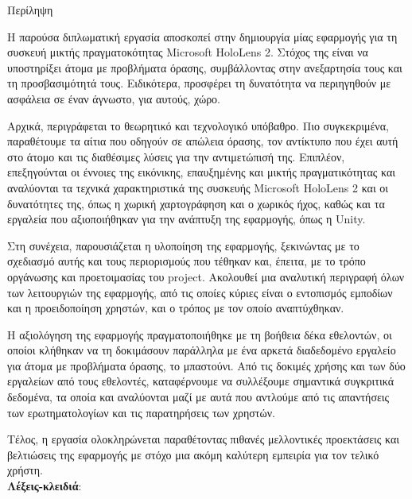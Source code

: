 \pagestyle{plain}
\begin{center}
{\LARGE Περίληψη}\\[1cm]
\end{center}

\setlength{\parindent}{0pt}
Η παρούσα διπλωματική εργασία αποσκοπεί στην δημιουργία μίας εφαρμογής για τη συσκευή μικτής πραγματοκότητας Microsoft HoloLens 2. Στόχος της είναι να υποστηρίξει άτομα με προβλήματα όρασης, συμβάλλοντας στην ανεξαρτησία τους και τη προσβασιμότητά τους. Ειδικότερα, προσφέρει τη δυνατότητα να περιηγηθούν με ασφάλεια σε έναν άγνωστο, για αυτούς, χώρο.

Αρχικά, περιγράφεται το θεωρητικό και τεχνολογικό υπόβαθρο. Πιο συγκεκριμένα, παραθέτουμε τα αίτια που οδηγούν σε απώλεια όρασης, τον αντίκτυπο που έχει αυτή στο άτομο και τις διαθέσιμες λύσεις για την αντιμετώπισή της. Επιπλέον, επεξηγούνται οι έννοιες της εικόνικης, επαυξημένης και μικτής πραγματικότητας και αναλύονται τα τεχνικά χαρακτηριστικά της συσκευής Microsoft HoloLens 2 και οι δυνατότητες της, όπως η χωρική χαρτογράφηση και ο χωρικός ήχος, καθώς και τα εργαλεία που αξιοποιήθηκαν για την ανάπτυξη της εφαρμογής, όπως η Unity.

Στη συνέχεια, παρουσιάζεται η υλοποίηση της εφαρμογής, ξεκινώντας με το σχεδιασμό αυτής και τους περιορισμούς που τέθηκαν και, έπειτα, με το τρόπο οργάνωσης και προετοιμασίας του project. Ακολουθεί μια αναλυτική περιγραφή όλων των λειτουργιών της εφαρμογής, από τις οποίες κύριες είναι ο εντοπισμός εμποδίων και η προειδοποίηση χρηστών, και ο τρόπος με τον οποίο αναπτύχθηκαν.

Η αξιολόγηση της εφαρμογής πραγματοποιήθηκε με τη βοήθεια δέκα εθελοντών, οι οποίοι κλήθηκαν να τη δοκιμάσουν παράλληλα με ένα αρκετά διαδεδομένο εργαλείο για άτομα με προβλήματα όρασης, το μπαστούνι. Από τις δοκιμές χρήσης και των δύο εργαλείων από τους εθελοντές, καταφέρνουμε να συλλέξουμε σημαντικά συγκριτικά δεδομένα, τα οποία και αναλύονται μαζί με αυτά που αντλούμε από τις απαντήσεις των ερωτηματολογίων και τις παρατηρήσεις των χρηστών.

Τέλος, η εργασία ολοκληρώνεται παραθέτοντας πιθανές μελλοντικές προεκτάσεις και βελτιώσεις της εφαρμογής με στόχο μια ακόμη καλύτερη εμπειρία για τον τελικό χρήστη.
\\[\baselineskip]
\textbf{Λέξεις-κλειδιά}: {\keywords}